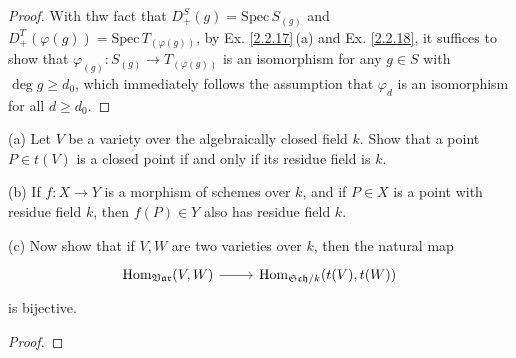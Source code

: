 \begin{proof}
	With thw fact that $D^S_+(g)=\mathrm{Spec}\,S_{(g)}$ and $D^T_+(\varphi(g))=\mathrm{Spec}\,T_{(\varphi(g))}$, by Ex. \ref{2.2.17}\,(a) and Ex. \ref{2.2.18}, it suffices to show that $\varphi_{(g)}:S_{(g)}\to T_{(\varphi(g))}$ is an isomorphism for any $g\in S$ with $\deg g\geq d_0$, which immediately follows the assumption that $\varphi_d$ is an isomorphism for all $d\geq d_0$.
\end{proof}

\begin{exe}
	\label{2.2.15}
	(a) Let $V$ be a variety over the algebraically closed field $k$. Show that a point $P \in t(V)$ is a closed point if and only if its residue field is $k$.
	
	(b) If $f : X \to Y$ is a morphism of schemes over $k$, and if $P \in X$ is a point with residue field $k$, then $f(P) \in Y$ also has residue field $k$.
	
	(c) Now show that if $V,W$ are two varieties over $k$, then the natural map 
	\begin{equation*}
		\begin{tikzcd}
			{\mathrm{Hom}_{\mathfrak{Var}}(V,W)} \arrow[r] & {\mathrm{Hom}_{\mathfrak{Sch}/k}(t(V),t(W))}
		\end{tikzcd}
	\end{equation*}
	is bijective.
\end{exe}

\begin{proof}
	
\end{proof}

